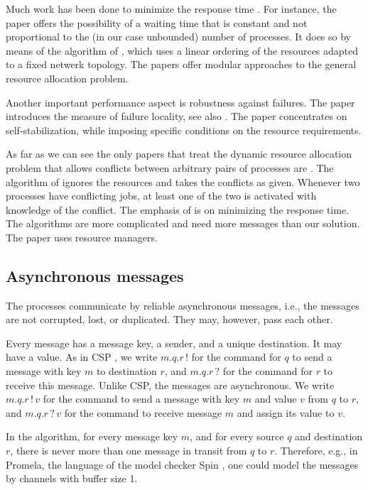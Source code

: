 \documentclass[10pt]{article} \usepackage[english]{babel}
\begin{document}
Much work has been done to minimize the response time
\cite{AwS90,ChS92,PJC93,Rhe98,WeL93}. For instance, the paper
\cite{WeL93} offers the possibility of a waiting time that is constant
and not proportional to the (in our case unbounded) number of
processes. It does so by means of the algorithm of \cite{Lyn81}, which
uses a linear ordering of the resources adapted to a fixed netwerk
topology.  The papers \cite{Rhe98,WeL93} offer modular approaches to
the general resource allocation problem.

Another important performance aspect is robustness against
failures. The paper \cite{ChS92} introduces the measure of failure
locality, see also \cite{SPS00}. The paper \cite{DGR05} concentrates
on self-stabilization, while imposing specific conditions on the
resource requirements.

As far as we can see the only papers that treat the dynamic resource
allocation problem that allows conflicts between arbitrary pairs of
processes are \cite{AwS90,Rhe98}.  The algorithm of \cite{AwS90}
ignores the resources and takes the conflicts as given. Whenever two
processes have conflicting jobs, at least one of the two is activated
with knowledge of the conflict.  The emphasis of \cite{AwS90,Rhe98} is
on minimizing the response time.  The algorithms are more complicated
and need more messages than our solution.  The paper \cite{Rhe98} uses
resource managers.

\subsection{Asynchronous messages} \label{async}

The processes communicate by reliable asynchronous messages, i.e., the
messages are not corrupted, lost, or duplicated.  They may, however,
pass each other.

Every message has a message key, a sender, and a unique destination.
It may have a value.  As in CSP \cite{Hoa85}, we write $m.q.r\,!$ for
the command for $q$ to send a message with key $m$ to destination $r$,
and $m.q.r\,?$ for the command for $r$ to receive this message.
Unlike CSP, the messages are asynchronous.  We write $m.q.r\,!\,v$ for
the command to send a message with key $m$ and value $v$ from $q$ to
$r$, and $m.q.r\,?\,v$ for the command to receive message $m$ and
assign its value to $v$.

In the algorithm, for every message key $m$, and for every source $q$
and destination $r$, there is never more than one message in transit
from $q$ to $r$. Therefore, e.g., in Promela, the language of the
model checker Spin \cite{Hol04}, one could model the messages by
channels with buffer size 1.  
\end{document}
